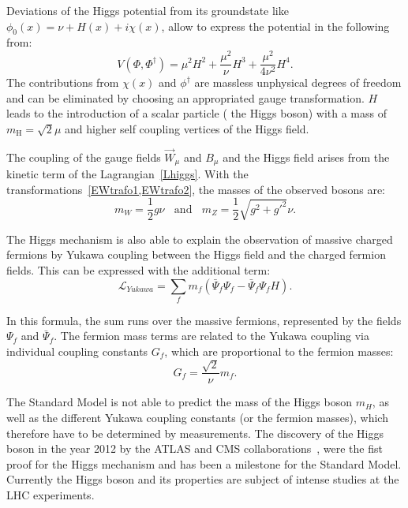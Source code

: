 Deviations of the Higgs potential from its groundstate  like $\phi_0(x)=\nu + H(x)+ i\chi(x)$, allow to express the potential in the following from:
\begin{equation}
  V(\Phi,\Phi^{\dagger})=\mu^2H^2+\frac{\mu^2}{\nu}H^3 + \frac{\mu^2}{4\nu^2}H^4.
\end{equation}
The contributions from $\chi(x)$ and $\phi^{\dagger}$ are massless unphysical degrees of freedom and can be eliminated by choosing an appropriated gauge transformation. $H$ leads to the introduction of a scalar particle ( the Higgs boson) with a mass of
$m_{\text{H}}=\sqrt{2}\mu$
and higher self coupling vertices of the Higgs field.

The coupling of the gauge fields $\vec{W}_{\mu}$ and $B_{\mu}$ and the Higgs field arises from the  kinetic term of the Lagrangian~\cref{Lhiggs}. With the transformations~\cref{EWtrafo1,EWtrafo2}, the masses of the observed bosons are:
\begin{equation}
 m_W=\frac{1}{2}g\nu ~~~~ \mathrm{and} ~~~~m_Z=\frac{1}{2}\sqrt{g^2+g'^2}\nu. 
\end{equation}  
 
 
 The Higgs mechanism is also able to explain the observation of massive charged fermions by Yukawa coupling between the Higgs field and the charged fermion fields.
This can be expressed with the additional term:  
\begin{equation}
\mathscr{L}_{Yukawa}=\sum_{f}m_f(\bar{\Psi}_f\Psi_f-\bar{\Psi}_f\Psi_f H).
\end{equation} 

In this formula, the sum runs over the massive fermions, represented by the fields $\Psi_f$ and $\bar{\Psi}_f$. The fermion mass terms are related to the Yukawa coupling via individual coupling constants $G_f$, which are proportional to the fermion masses: 
\begin{equation}\label{Higpro}
G_f = \frac{\sqrt{2}}{\nu} m_f.
\end{equation} 

The Standard Model is not able to predict the mass of the Higgs boson $m_H$, as well as the different Yukawa coupling constants (or the fermion masses), which therefore have to be determined by measurements. The discovery of the Higgs boson in the year 2012 by the ATLAS and CMS collaborations~\cite{Aad:2012tfa,Chatrchyan:2012xdj}, were the fist proof for the Higgs mechanism and has been a milestone for the Standard Model. Currently the Higgs boson and its properties are subject of intense studies at the LHC experiments. 
























